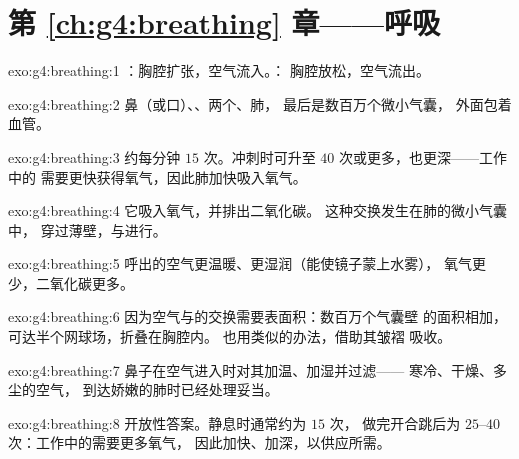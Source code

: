 \section*{第 \ref{ch:g4:breathing} 章——呼吸}

\begin{solution}{exo:g4:breathing:1}
：胸腔扩张，空气流入。：
胸腔放松，空气流出。
\end{solution}

\begin{solution}{exo:g4:breathing:2}
鼻（或口）、、两个、肺，
最后是数百万个微小气囊，
外面包着血管。
\end{solution}

\begin{solution}{exo:g4:breathing:3}
约每分钟 $15$ 次。冲刺时可升至 $40$
次或更多，也更深——工作中的
需要更快获得氧气，因此肺加快吸入氧气。
\end{solution}

\begin{solution}{exo:g4:breathing:4}
它吸入氧气，并排出二氧化碳。
这种交换发生在肺的微小气囊中，
穿过薄壁，与进行。
\end{solution}

\begin{solution}{exo:g4:breathing:5}
呼出的空气更温暖、更湿润（能使镜子蒙上水雾），
氧气更少，二氧化碳更多。
\end{solution}

\begin{solution}{exo:g4:breathing:6}
因为空气与的交换需要表面积：数百万个气囊壁
的面积相加，可达半个网球场，折叠在胸腔内。
也用类似的办法，借助其皱褶
吸收。
\end{solution}

\begin{solution}{exo:g4:breathing:7}
鼻子在空气进入时对其加温、加湿并过滤——
寒冷、干燥、多尘的空气，
到达娇嫩的肺时已经处理妥当。
\end{solution}

\begin{solution}{exo:g4:breathing:8}
开放性答案。静息时通常约为 $15$ 次，
做完开合跳后为 $25$--$40$ 次：工作中的需要更多氧气，
因此加快、加深，以供应所需。
\end{solution}

